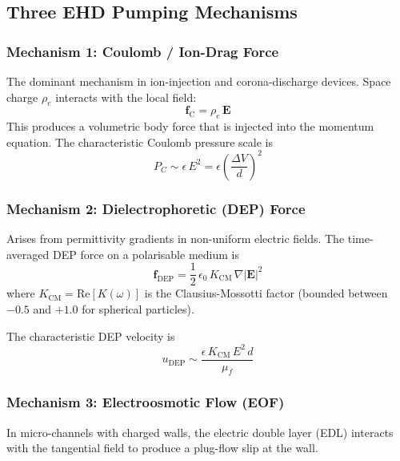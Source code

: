 \documentclass[11pt,a4paper]{article}
\begin{document}
\subsection{Three EHD Pumping Mechanisms}

\subsubsection{Mechanism 1: Coulomb / Ion-Drag Force}

The dominant mechanism in ion-injection and corona-discharge devices.
Space charge $\rho_e$ interacts with the local field:
\begin{equation}\label{eq:f_coulomb}
  \bm{f}_{\mathrm{C}} = \rho_e\,\bm{E}
\end{equation}
This produces a volumetric body force that is injected into the momentum
equation.  The characteristic Coulomb pressure scale is
\begin{equation}\label{eq:P_coulomb}
  P_C \sim \epsilon\,E^2 = \epsilon\!\left(\frac{\Delta V}{d}\right)^{\!2}
\end{equation}

\subsubsection{Mechanism 2: Dielectrophoretic (DEP) Force}

Arises from permittivity gradients in non-uniform electric fields.  The
time-averaged DEP force on a polarisable medium is
\begin{equation}\label{eq:f_dep}
  \bm{f}_{\mathrm{DEP}} = \frac{1}{2}\,\epsilon_0\,K_{\mathrm{CM}}
    \,\nabla|\bm{E}|^2
\end{equation}
where $K_{\mathrm{CM}} = \mathrm{Re}[K(\omega)]$ is the Clausius-Mossotti
factor (bounded between $-0.5$ and $+1.0$ for spherical particles).

The characteristic DEP velocity is
\begin{equation}\label{eq:u_dep}
  u_{\mathrm{DEP}} \sim
    \frac{\epsilon\,K_{\mathrm{CM}}\,E^2\,d}{\mu_f}
\end{equation}

\subsubsection{Mechanism 3: Electroosmotic Flow (EOF)}

In micro-channels with charged walls, the electric double layer (EDL)
interacts with the tangential field to produce a plug-flow slip at the wall.
\end{document}
